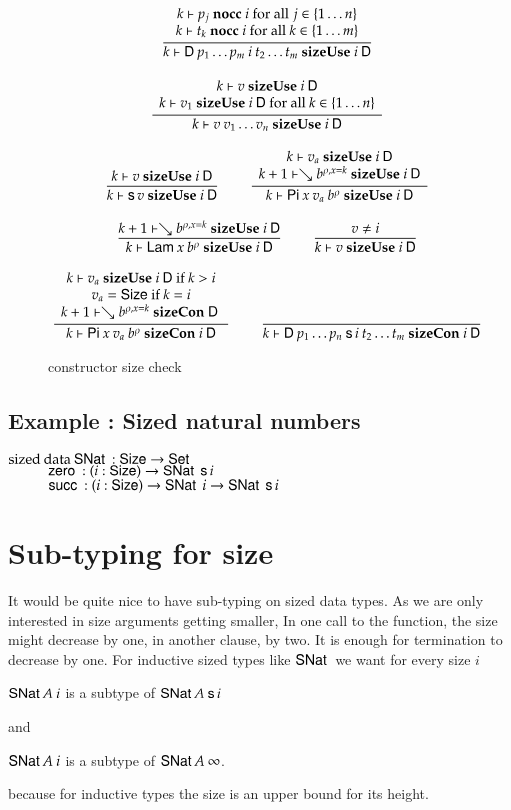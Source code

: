\begin{figure}
\begin{gather*}
\ \dfrac{\begin{array}[b]{c}k\vdash p_j\mbox{ \textbf{nocc} }i \mbox { for all } j \in \{ 1 \ldots n\}\\k\vdash t_k\mbox{ \textbf{nocc} }i \mbox { for all } k \in \{ 1 \ldots m\}\end{array}}{k\vdash\mathsf{D} \: p_1 \ldots p_m \: i \: t_2 \ldots t_m\mbox{ \textbf{sizeUse} }i\:\mathsf{D}}
\\[2ex]
\ \dfrac{\begin{array}[b]{c}k\vdash v\mbox{ \textbf{sizeUse} }i\:\mathsf{D}\\k\vdash v_1\mbox{ \textbf{sizeUse} }i\:\mathsf{D} \mbox { for all } k \in \{ 1 \ldots n\}\end{array}}{k\vdash v \: v_1 \ldots v_n\mbox{ \textbf{sizeUse} }i\:\mathsf{D}}
\\[2ex]
\ \dfrac{k\vdash v\mbox{ \textbf{sizeUse} }i\:\mathsf{D}}{k\vdash\mathsf{s}\, v\mbox{ \textbf{sizeUse} }i\:\mathsf{D}}
\qquad
\ \dfrac{\begin{array}[b]{c}k\vdash v_a\mbox{ \textbf{sizeUse} }i\:\mathsf{D}\\k+1\vdash\searrow b^{\rho,x=k}\mbox{ \textbf{sizeUse} }i\:\mathsf{D}\end{array}}{k\vdash\mathsf{Pi} \: x \: v_a \: b^{\rho}\mbox{ \textbf{sizeUse} }i\:\mathsf{D}}
\\[2ex]
\ \dfrac{k+1\vdash\searrow b^{\rho,x=k}\mbox{ \textbf{sizeUse} }i\:\mathsf{D}}{k\vdash\mathsf{Lam} \: x \: b^{\rho}\mbox{ \textbf{sizeUse} }i\:\mathsf{D}}
\qquad
\ \dfrac{v \neq i}{k\vdash v\mbox{ \textbf{sizeUse} }i\:\mathsf{D}}
\\[2ex]
\ \dfrac{\begin{array}[b]{c}k\vdash v_a\mbox{ \textbf{sizeUse} }i\:\mathsf{D} \mbox{ if } k > i\\v_a = \mathsf{Size} \mbox { if } k = i \\k+1\vdash\searrow b^{\rho,x=k}\mbox{ \textbf{sizeCon} }\mathsf{D}\:\end{array}}{k\vdash\mathsf{Pi} \: x \: v_a \: b^{\rho}\mbox{ \textbf{sizeCon} }i\:\mathsf{D}}
\qquad
\ \dfrac{}{k\vdash\mathsf{D} \:p_1 \ldots p_n \: \mathsf{s}\, i \:t_2 \ldots t_m\mbox{ \textbf{sizeCon} }i\:\mathsf{D}}
\end{gather*}
\caption{constructor size check}
\end{figure}

\subsection{Example : Sized natural numbers}
\begin{bsp}
$\mathrm{sized}\: \mathrm{data}\: \mathsf{SNat}\: : \mathsf{Size} \rightarrow \mathsf{Set} $ \\
$\spcx \zero : \EPi{i}{\Size}{ \SNat \: \s i} $\\
$\spcx \suc : \EPi{i}{\Size}{ \SNat \: i \ra \SNat \: \s i} $
\end{bsp}

\section{Sub-typing for size}
It would be quite nice to have sub-typing on sized data types.
As we are only interested in size arguments getting smaller, 
In one call to the function, the size might decrease by one, in another clause, by two.
It is enough for termination to decrease by one.
For inductive sized types like $\mathsf{SNat}\:$ we want for every size $i$
\begin{bsp}
$\mathsf{SNat}\: A\: i$ is a subtype of $\mathsf{SNat}\: A \: \mathsf{s}\, i$
\end{bsp}
and
\begin{bsp}
$\mathsf{SNat}\: A\: i$ is a subtype of $\mathsf{SNat}\: A \: \infty$.
\end{bsp}
because for inductive types the size is an upper bound for its height.

